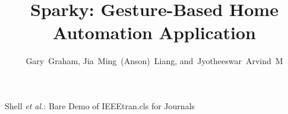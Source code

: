 \documentclass[journal]{IEEEtran}
\begin{document}
%
\title{Sparky: Gesture-Based Home Automation Application}
%
%
%

\author{Gary~Graham,
        Jia~Ming~(Anson)~Liang,
        and~Jyotheeswar~Arvind~M%
}

% 
%



%
{Shell \MakeLowercase{\textit{et al.}}: Bare Demo of IEEEtran.cls for Journals}
% 




\end{document}
